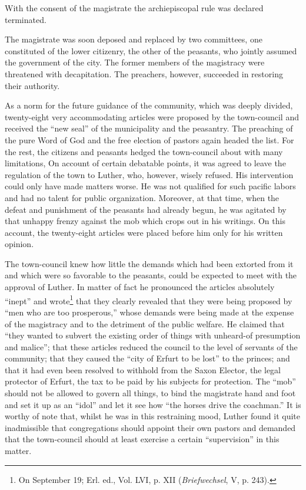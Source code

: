 With the consent of the magistrate the archiepiscopal rule was
declared terminated.

The magistrate was soon deposed and replaced by two committees,
one constituted of the lower citizenry, the other of the peasants, who
jointly assumed the government of the city. The former members of
the magistracy were threatened with decapitation. The preachers,
however, succeeded in restoring their authority.

As a norm for the future guidance of the community, which
was deeply divided, twenty-eight very accommodating articles were
proposed by the town-council and received the “new seal” of the
municipality and the peasantry. The preaching of the pure Word
of God and the free election of pastors again headed the list. For
the rest, the citizens and peasants hedged the town-council about
with many limitations, On account of certain debatable points, it
was agreed to leave the regulation of the town to Luther, who,
however, wisely refused. His intervention could only have made
matters worse. He was not qualified for such pacific labors and
had no talent for public organization. Moreover, at that time,
when the defeat and punishment of the peasants had already begun, he
was agitated by that unhappy frenzy against the mob which crops
out in his writings. On this account, the twenty-eight articles were
placed before him only for his written opinion.

The town-council knew how little the demands which had been
extorted from it and which were so favorable to the peasants, could
be expected to meet with the approval of Luther. In matter of
fact he pronounced the articles absolutely “inept” and wrote\footnote
{On September 19; Erl. ed., Vol. LVI, p. XII (\textit{Briefwechsel}, V, p. 243).}
that they clearly revealed that they were being proposed by “men
who are too prosperous,” whose demands were being made at the
expense of the magistracy and to the detriment of the public welfare.
He claimed that “they wanted to subvert the existing order
of things with unheard-of presumption and malice”; that these
articles reduced the council to the level of servants of the community;
that they caused the “city of Erfurt to be lost” to the
princes; and that it had even been resolved to withhold from the
Saxon Elector, the legal protector of Erfurt, the tax to be paid by his
subjects for protection. The “mob” should not be allowed to govern
all things, to bind the magistrate hand and foot and set it up as
an “idol” and let it see how “the horses drive the coachman.” It
is worthy of note that, whilst he was in this restraining mood, Luther
found it quite inadmissible that congregations should appoint their
own pastors and demanded that the town-council should at least
exercise a certain “supervision” in this matter.

